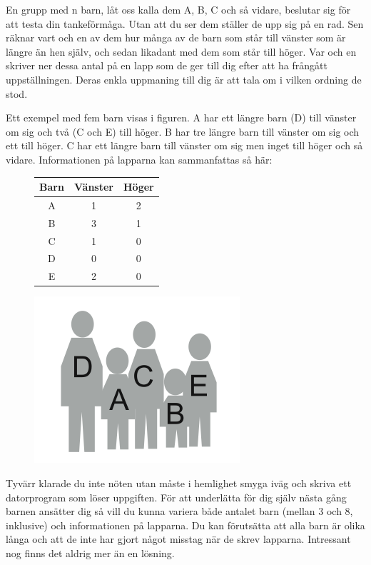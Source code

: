 En grupp med n barn, låt oss kalla dem A, B, C och så vidare, beslutar sig för att testa din tankeförmåga.
Utan att du ser dem ställer de upp sig på en rad.
Sen räknar vart och en av dem hur många av de barn som står till vänster som är längre än hen själv, och sedan likadant med dem som står till höger.
Var och en skriver ner dessa antal på en lapp som de ger till dig efter att ha frångått uppställningen.
Deras enkla uppmaning till dig är att tala om i vilken ordning de stod.

Ett exempel med fem barn visas i figuren.
A har ett längre barn (D) till vänster om sig och två (C och E) till höger.
B har tre längre barn till vänster om sig och ett till höger.
C har ett längre barn till vänster om sig men inget till höger och så vidare.
Informationen på lapparna kan sammanfattas så här:

\begin{figure}[h!]
  \centering

\begin{minipage}{.5\textwidth}
    \begin{tabular}[b]{|c|c|c|}
    \hline
      Barn&Vänster&Höger\\\hline
      A&1&2\\
      B&3&1\\
      C&1&0\\
      D&0&0\\
      E&2&0\\\hline
    \end{tabular}
\end{minipage}%
\begin{minipage}{.5\textwidth}
    \includegraphics[scale=0.4]{uppstallning.png}
\end{minipage}

\end{figure}

Tyvärr klarade du inte nöten utan måste i hemlighet smyga iväg och skriva ett datorprogram som löser uppgiften.
För att underlätta för dig själv nästa gång barnen ansätter dig så vill du kunna variera både antalet barn (mellan 3 och 8, inklusive) och informationen på lapparna.
Du kan förutsätta att alla barn är olika långa och att de inte har gjort något misstag när de skrev lapparna.
Intressant nog finns det aldrig mer än en lösning.

